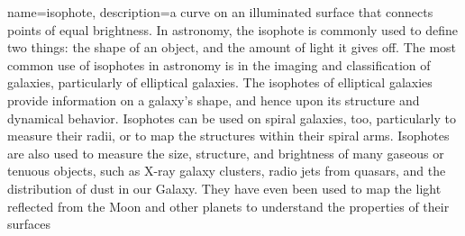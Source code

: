 {
	name={isophote},
	description={a curve on an illuminated surface that connects points of equal brightness. In astronomy, the isophote is commonly used to define two things: the shape of an object, and the amount of light it gives off. The most common use of isophotes in astronomy is in the imaging and classification of galaxies, particularly of elliptical galaxies. The isophotes of elliptical galaxies provide information on a galaxy's shape, and hence upon its structure and dynamical behavior. Isophotes can be used on spiral galaxies, too, particularly to measure their radii, or to map the structures within their spiral arms. Isophotes are also used to measure the size, structure, and brightness of many gaseous or tenuous objects, such as X-ray galaxy clusters, radio jets from quasars, and the distribution of dust in our Galaxy. They have even been used to map the light reflected from the Moon and other planets to understand the properties of their surfaces}
}